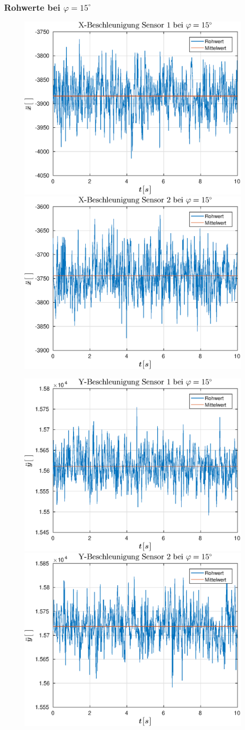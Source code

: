 \newpage
{\subsubsection{Rohwerte bei $\varphi = 15^{\circ}$}
\begin{figure}[h]
	\includegraphics[width=0.5\linewidth]{img/X1__dd___phi_15.eps}
	\includegraphics[width=0.5\linewidth]{img/X2__dd___phi_15.eps}
\end{figure}
\begin{figure}[h]
	\includegraphics[width=0.5\linewidth]{img/Y1__dd___phi_15.eps}
	\includegraphics[width=0.5\linewidth]{img/Y2__dd___phi_15.eps}
\end{figure}}

